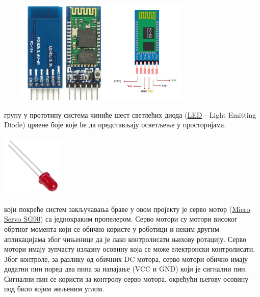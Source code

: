 \documentclass[12pt]{article}
\begin{document}
\begin{center}
    \centering 
    \includegraphics[height=5cm, width=10cm]{images/hc-05}
\end{center}
\vspace{0.5cm}
\indent{} групу у прототипу система чиниће шест светлећих диода (\href{https://en.wikipedia.org/wiki/Light-emitting_diode}{LED} - Light Emitting Diode) црвене боје које ће да представљају осветљење у просторијама.
\vspace{0.5cm}
\begin{center}
    \centering 
    \includegraphics[height=3cm, width=3cm]{images/led}
\end{center}
\vspace{0.5cm}
\indent{} који покреће систем закључавања браве у овом пројекту је серво мотор (\href{http://www.ee.ic.ac.uk/pcheung/teaching/DE1_EE/stores/sg90_datasheet.pdf}{Micro Servo SG90}) са једнокраким пропелером. Серво мотори су мотори високог обртног момента који се обично користе у роботици и неким другим апликацијама због чињенице да је лако контролисати њихову ротацију. Серво мотори имају зупчасту излазну осовину која се може електронски контролисати. Због контроле, за разлику од обичних DC мотора, серво мотори обично имају додатни пин поред два пина за напајање (VCC и GND) који је сигнални пин. Сигнални пин се користи за контролу серво мотора, окрећући његову осовину под било којим жељеним углом.
\end{document}
